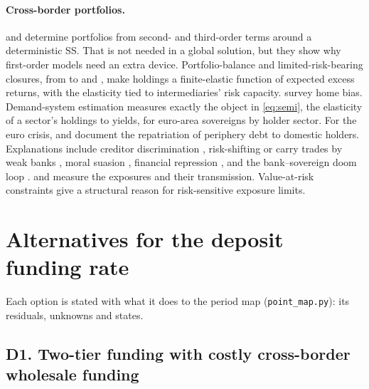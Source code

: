 \documentclass[11pt]{article}
\newcommand{\code}[1]{\texttt{\small #1}}
\begin{document}
\paragraph{Cross-border portfolios.} \citet{devereux2011country} and \citet{tille2010international}
determine portfolios from second- and third-order terms around a deterministic SS. That is not
needed in a global solution, but they show why first-order models need an extra device.
Portfolio-balance and limited-risk-bearing closures, from \citet{blanchard2005international} to
\citet{gabaix2015international} and \citet{itskhoki2021exchange}, make holdings a finite-elastic
function of expected excess returns, with the elasticity tied to intermediaries' risk capacity.
\citet{coeurdacier2013home} survey home bias. Demand-system estimation
\citep{koijen2019demand,koijen2021inspecting} measures exactly the object in \eqref{eq:semi},
the elasticity of a sector's holdings to yields, for euro-area sovereigns by holder sector. For
the euro crisis, \citet{broner2014sovereign} and \citet{brutti2016repatriation} document the
repatriation of periphery debt to domestic holders. Explanations include creditor
discrimination \citep{broner2014sovereign}, risk-shifting or carry trades by weak banks
\citep{acharya2015greatest}, moral suasion \citep{ongena2019invisible}, financial repression
\citep{becker2018financial}, and the bank--sovereign doom loop
\citep{farhi2018deadly,gennaioli2014sovereign}. \citet{altavilla2017bank} and
\citet{battistini2014systemic} measure the exposures and their transmission. Value-at-risk
constraints \citep{adrian2014procyclical} give a structural reason for risk-sensitive exposure
limits.

\section{Alternatives for the deposit funding rate}
\label{sec:dep}

Each option is stated with what it does to the period map (\code{point\_map.py}): its
residuals, unknowns and states.

\subsection*{D1. Two-tier funding with costly cross-border wholesale funding}
\end{document}
